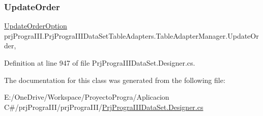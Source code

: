 \subsubsection{\texorpdfstring{Update\+Order}{UpdateOrder}}
{\footnotesize\ttfamily \hyperlink{classprj_progra_i_i_i_1_1_prj_progra_i_i_i_data_set_table_adapters_1_1_table_adapter_manager_ada8b937dd32f0e82f86deb1a45b384a6}{Update\+Order\+Option} prj\+Progra\+I\+I\+I.\+Prj\+Progra\+I\+I\+I\+Data\+Set\+Table\+Adapters.\+Table\+Adapter\+Manager.\+Update\+Order\hspace{0.3cm}{\ttfamily [get]}, {\ttfamily [set]}}



Definition at line 947 of file Prj\+Progra\+I\+I\+I\+Data\+Set.\+Designer.\+cs.



The documentation for this class was generated from the following file\+:\begin{DoxyCompactItemize}
\item 
E\+:/\+One\+Drive/\+Workspace/\+Proyecto\+Progra/\+Aplicacion C\#/prj\+Progra\+I\+I\+I/prj\+Progra\+I\+I\+I/\hyperlink{_prj_progra_i_i_i_data_set_8_designer_8cs}{Prj\+Progra\+I\+I\+I\+Data\+Set.\+Designer.\+cs}\end{DoxyCompactItemize}
